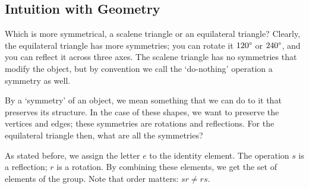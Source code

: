 \subsection{Intuition with Geometry}
Which is more symmetrical, a scalene triangle or an equilateral triangle?
Clearly, the equilateral triangle has more symmetries; you can rotate it \(120\degree\) or \(240\degree\), and you can reflect it across three axes.
The scalene triangle has no symmetries that modify the object, but by convention we call the `do-nothing' operation a symmetry as well.

By a `symmetry' of an object, we mean something that we can do to it that preserves its structure.
In the case of these shapes, we want to preserve the vertices and edges; these symmetries are rotations and reflections.
For the equilateral triangle then, what are all the symmetries?


As stated before, we assign the letter \(e\) to the identity element.
The operation \(s\) is a reflection; \(r\) is a rotation.
By combining these elements, we get the set of elements of the group.
Note that order matters: \(sr\neq rs\).

